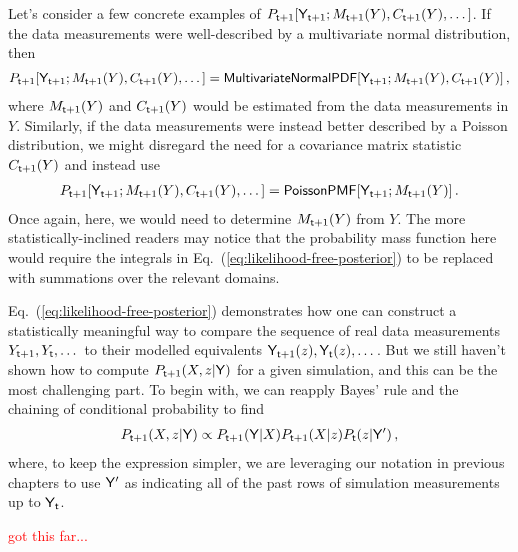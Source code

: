 Let's consider a few concrete examples of $P_{{\sf t}+1}[{\sf Y}_{{\sf t}+1};M_{{\sf t}+1}(Y),C_{{\sf t}+1}(Y), \dots ]$. If the data measurements were well-described by a multivariate normal distribution, then
\begin{align}
P_{{\sf t}+1}[{\sf Y}_{{\sf t}+1};M_{{\sf t}+1}(Y),C_{{\sf t}+1}(Y), \dots ] = {\sf MultivariateNormalPDF}[{\sf Y}_{{\sf t}+1};M_{{\sf t}+1}(Y),C_{{\sf t}+1}(Y)]\,,
\end{align}
where $M_{{\sf t}+1}(Y)$ and $C_{{\sf t}+1}(Y)$ would be estimated from the data measurements in $Y$. Similarly, if the data measurements were instead better described by a Poisson distribution, we might disregard the need for a covariance matrix statistic $C_{{\sf t}+1}(Y)$ and instead use
\begin{align}
P_{{\sf t}+1}[{\sf Y}_{{\sf t}+1};M_{{\sf t}+1}(Y),C_{{\sf t}+1}(Y), \dots ] = {\sf PoissonPMF}[{\sf Y}_{{\sf t}+1};M_{{\sf t}+1}(Y)]\,.
\end{align}
Once again, here, we would need to determine $M_{{\sf t}+1}(Y)$ from $Y$. The more statistically-inclined readers may notice that the probability mass function here would require the integrals in Eq.~(\ref{eq:likelihood-free-posterior}) to be replaced with summations over the relevant domains.

Eq.~(\ref{eq:likelihood-free-posterior}) demonstrates how one can construct a statistically meaningful way to compare the sequence of real data measurements $Y_{{\sf t}+1}, Y_{{\sf t}}, \dots$ to their modelled equivalents ${\sf Y}_{{\sf t}+1}(z), {\sf Y}_{{\sf t}}(z), \dots$. But we still haven't shown how to compute $P_{{\sf t}+1}(X,z\vert {\sf Y})$ for a given simulation, and this can be the most challenging part. To begin with, we can reapply Bayes' rule and the chaining of conditional probability to find 
\begin{align}
P_{{\sf t}+1}(X,z\vert {\sf Y}) \propto P_{{\sf t}+1}({\sf Y}\vert X)P_{{\sf t}+1}(X\vert z)P_{{\sf t}}(z\vert {\sf Y}') \,,
\end{align}
where, to keep the expression simpler, we are leveraging our notation in previous chapters to use ${\sf Y}'$ as indicating all of the past rows of simulation measurements up to ${\sf Y}_{{\sf t}}$. 

\textcolor{red}{got this far...}

